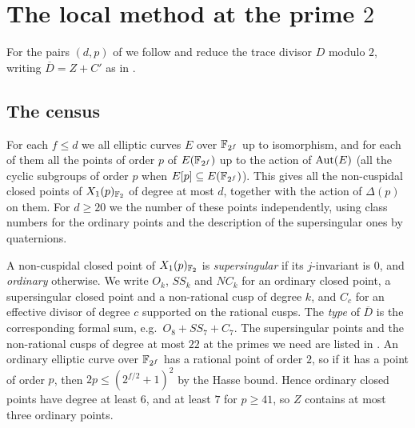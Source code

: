 \section{The local method at the prime \texorpdfstring{$2$}{2}}\label{sec:local}

For the pairs $(d,p)$ of  we follow \cite[Section 8]{DKSS} and reduce the trace divisor $D$ modulo $2$, writing $\overline D=Z+C'$ as in .

\subsection{The census}\label{sec:census}
For each $f\leq d$ we  all elliptic curves $E$ over $\mathbb{F}_{2^f}$ up to isomorphism, and for each of them all the points of order $p$ of $E(\mathbb{F}_{2^f})$ up to the action of $\operatorname{Aut}(E)$ (all the cyclic subgroups of order $p$ when $E[p]\subseteq E(\mathbb{F}_{2^f})$). This gives all the non-cuspidal closed points of $X_1(p)_{\mathbb{F}_2}$ of degree at most $d$, together with the action of $\Delta(p)$ on them. For $d\geq 20$ we  the number of these points independently, using class numbers for the ordinary points and the description of the supersingular ones by quaternions.

A non-cuspidal closed point of $X_1(p)_{\mathbb{F}_2}$ is \textit{supersingular} if its $j$-invariant is $0$, and \textit{ordinary} otherwise. We write $O_k$, $SS_k$ and $NC_k$ for an ordinary closed point, a supersingular closed point and a non-rational cusp of degree $k$, and $C_c$ for an effective divisor of degree $c$ supported on the rational cusps. The \textit{type} of $\overline D$ is the corresponding formal sum, e.g.\ $O_8+SS_7+C_7$. The supersingular points and the non-rational cusps of degree at most $22$ at the primes we need are listed in . An ordinary elliptic curve over $\mathbb{F}_{2^f}$ has a rational point of order $2$, so if it has a point of order $p$, then $2p\leq(2^{f/2}+1)^2$ by the Hasse bound. Hence ordinary closed points have degree at least $6$, and at least $7$ for $p\geq41$, so $Z$ contains at most three ordinary points.

